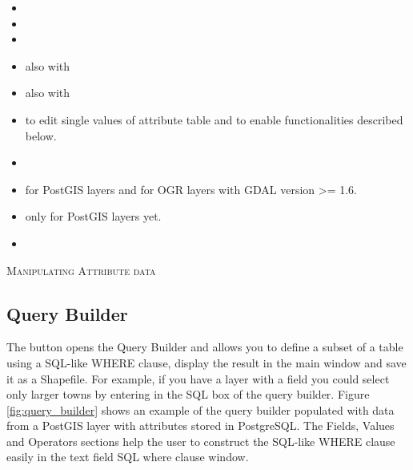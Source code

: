 \begin{itemize}
\item {}
\item {}
\item {}
\item {} also with 
\item {} also with 
\item {} to edit single values 
of attribute table and to enable functionalities described below.
\item {}
\item {} for PostGIS layers and for OGR layers with GDAL version >= 1.6.
\item {} only for PostGIS layers yet.
\item {} 
\end{itemize}

\begin{Tip}[ht]\caption{\textsc{Manipulating Attribute data}}
\end{Tip}

\subsection{Query Builder}\label{sec:query_builder}

The  button opens the Query Builder and allows you to 
define a subset of a table using a SQL-like WHERE clause, display the result in the 
main window and save it as a Shapefile. For example, if you have a 
 layer 
with a  field you could select only larger towns by entering
 in the SQL box of the query builder. Figure
\ref{fig:query_builder} shows an example of the query builder populated with
data from a PostGIS layer with attributes stored in PostgreSQL. 
The Fields, Values and Operators sections help the user to construct the SQL-like
WHERE clause easily in the text field SQL where clause window.


